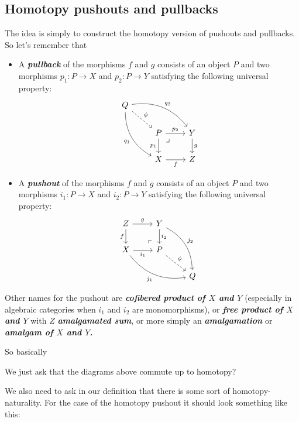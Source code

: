 \begin{remark}
\subsection{Homotopy pushouts and pullbacks}
The idea is simply to construct the homotopy version of pushouts and pullbacks. So let's remember that
\begin{defn}\leavevmode 
	\begin{itemize}
		\item A \textbf{\textit{pullback}} of the morphisms $f$ and $g$ consists of an object $P$ and two morphisms $p_1:P\to X$ and $p_2:P\to Y$ satisfying the following universal property:
		\[\begin{tikzcd}
			Q\arrow[rrd,bend left,"q_2"]\arrow[ddr,"q_1",swap,bend right]\arrow[dr,dashed,"\phi"]\\
			&P\arrow[r,"p_2"] \arrow[rd, phantom, "\lrcorner", very near start]\arrow[d,"p_1",swap]&Y\arrow[d,"g"]\\
			&X\arrow[r,"f",swap]&Z
		\end{tikzcd}\]
		\item A \textbf{\textit{pushout}} of the morphisms $f$ and $g$ consists of an object $P$ and two morphisms $i_1:P\to X$ and $i_2:P\to Y$ satisfying the following universal property:
		\[\begin{tikzcd}
			Z\arrow[r,"g"]\arrow[d,swap,"f"]&Y\arrow[d,"i_2"]\arrow[ddr,bend left,"j_2"]\\
			X\arrow[r,"i_1",swap]\arrow[drr,bend right,swap,"j_1"]&P\arrow[ul, phantom, "\ulcorner", very near start]\arrow[dr,dashed,"\phi"]\\
			&&Q
		\end{tikzcd}\]
	\end{itemize}
		\begin{remark}
			Other names for the pushout are \textbf{\textit{cofibered product of $X$ and $Y$}} (especially in algebraic categories when $i_1$ and $i_2$ are monomorphisms), or \textbf{\textit{free product of $X$ and $Y$}} with $Z$ \textbf{\textit{amalgamated sum}}, or more simply an \textbf{\textit{amalgamation}} or \textbf{\textit{amalgam of $X$ and $Y$.}}
		\end{remark}
So basically
\begin{defn}
	{\color{magenta}We just ask that the diagrams above commute up to homotopy?}
\end{defn}
\begin{remark}
	We also need to ask in our definition that there is some sort of homotopy-naturality. For the case of the homotopy pushout it should look something like this:

\end{remark}
\end{defn}
\end{remark}
